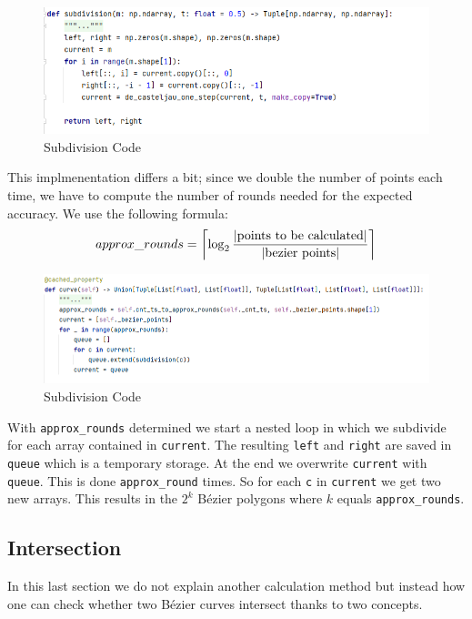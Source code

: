 \begin{figure}[H]
    \centering
    \includegraphics[width=\textwidth]{subdivision.png}
    \caption{Subdivision Code}
    \label{fig:my_label}
\end{figure}

This implmenentation differs a bit; since we double the number of points each time, we have to compute the number of rounds needed for the expected accuracy. We use the following formula:
\[approx\_rounds = \ceil[\bigg]{\log_2 \frac{|\text{points to be calculated}|}{|\text{bezier points}|}}\]
\begin{figure}[H]
    \centering
    \includegraphics[width=\textwidth]{subdiv_approx_curve.png}
    \caption{Subdivision Code}
    \label{fig:my_label}
\end{figure}
\newpage
With \texttt{approx\_rounds} determined we start a nested loop in which we subdivide for each array contained in \texttt{current}. The resulting \texttt{left} and \texttt{right} are saved in \texttt{queue} which is a temporary storage. At the end we overwrite \texttt{current} with \texttt{queue}. This is done \texttt{approx\_round} times. So for each \texttt{c} in \texttt{current} we get two new arrays. This results in the $2^k$ Bézier polygons where $k$ equals \texttt{approx\_rounds}.

\subsection{Intersection}
In this last section we do not explain another calculation method but instead how one can check whether two Bézier curves intersect thanks to two concepts.

